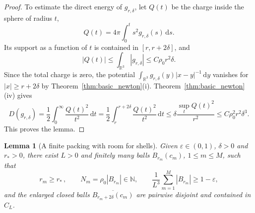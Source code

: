 \documentclass[final,reqno]{amsart}
\newtheorem{lemma}[theorem]{Lemma}
\theoremstyle{remark}
\theoremstyle{definition}
\renewcommand{\le}{\leqslant}
\renewcommand{\ge}{\geqslant}
\newcommand{\RR}{\mathbb{R}}
\newcommand{\NN}{\mathbb{N}}
\begin{document}
\begin{proof}
To estimate the direct energy of $g_{r,\delta}$, let $Q(t)$ be the charge inside the sphere of radius $t$,
\[
Q(t)=4\pi\int_0^t s^2g_{r,\delta}(s)\,\mathrm ds.
\]
Its support as a function of $t$ is contained in $[r,r+2\delta]$, and
\[
|Q(t)|\le\int_{\RR^3}|g_{r,\delta}|
\le C\rho_0r^2\delta.
\]
Since the total charge is zero, the potential $\int_{\RR^3}g_{r,\delta}(y)|x-y|^{-1}\,\mathrm dy$ vanishes for $|x|\ge r+2\delta$ by Theorem~\ref{thm:basic_newton}(i). Theorem~\ref{thm:basic_newton}(iv) gives
\[
D(g_{r,\delta})
=\frac12\int_0^\infty\frac{Q(t)^2}{t^2}\,\mathrm dt
=\frac12\int_r^{r+2\delta}\frac{Q(t)^2}{t^2}\,\mathrm dt
\le\delta\frac{\sup_tQ(t)^2}{r^2}
\le C\rho_0^2r^2\delta^3.
\]
This proves the lemma.
\end{proof}

\begin{lemma}[A finite packing with room for shells]\label{lem:upper_packing}
Given $\varepsilon\in(0,1)$, $\delta>0$ and $r_*>0$, there exist $L>0$ and finitely many balls $B_{r_m}(c_m)$, $1\le m\le M$, such that
\[
r_m\ge r_*\,,
\qquad N_m=\rho_0|B_{r_m}|\in\NN,
\qquad
\frac1{L^3}\sum_{m=1}^M|B_{r_m}|\ge1-\varepsilon,
\]
and the enlarged closed balls $\overline{B_{r_m+2\delta}(c_m)}$ are pairwise disjoint and contained in $C_L$.
\end{lemma}
\end{document}
